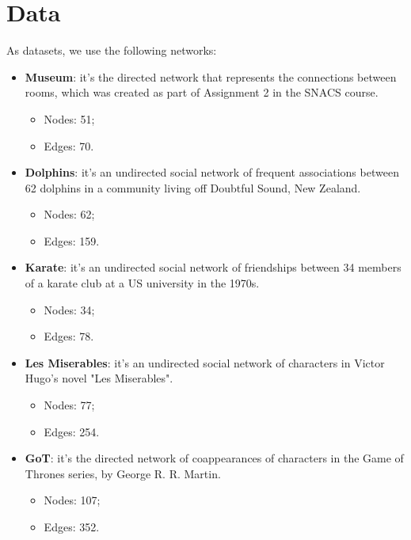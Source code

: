 \documentclass[sigconf]{acmart}
\begin{document}
\section{Data} \label{sec:data}
As datasets, we use the following networks:
\begin{itemize}
    \item \textbf{Museum}: it's the directed network that represents the connections between rooms, which was created as part of Assignment 2 in the SNACS course.
    \begin{itemize}
        \item Nodes: 51;
        \item Edges: 70.
    \end{itemize}
    \item \textbf{Dolphins}: it's an undirected social network of frequent associations between 62 dolphins in a community living off Doubtful Sound, New Zealand. \cite{dolphins}
    \begin{itemize}
        \item Nodes: 62;
        \item Edges: 159.
    \end{itemize}
    \item \textbf{Karate}: it's an undirected social network of friendships between 34 members of a karate club at a US university in the 1970s. \cite{karate}
    \begin{itemize}
        \item Nodes: 34;
        \item Edges: 78.
    \end{itemize}
    \item \textbf{Les Miserables}: it's an undirected social network of characters in Victor Hugo's novel "Les Miserables". \cite{lesmiserables}
    \begin{itemize}
        \item Nodes: 77;
        \item Edges: 254.
    \end{itemize}
    \item \textbf{GoT}: it's the directed network of coappearances of characters in the Game of Thrones series, by George R. R. Martin. \cite{got}
    \begin{itemize}
        \item Nodes: 107;
        \item Edges: 352.
    \end{itemize}
\end{itemize}
\end{document}
